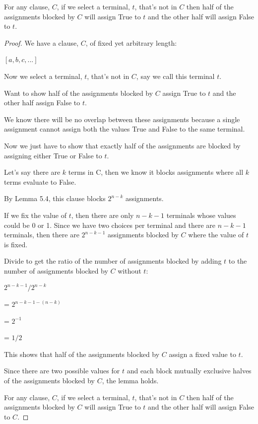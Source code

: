 \documentclass[manuscript]{acmart}
\begin{document}
    \begin{lemma}
        For any clause, $C$, if we select a terminal, $t$, that's not in $C$ 
        then half of the assignments
        blocked by $C$ will assign True to $t$ and the other half will assign 
        False to $t$.
    \end{lemma}
    \begin{proof}
        We have a clause, $C$, of fixed yet arbitrary length:

        $[a, b, c, ...]$

        Now we select a terminal, $t$, that's not in $C$, say we call this
        terminal $t$.

        Want to show half of the assignments blocked by $C$ assign True to 
        $t$ and the other half assign False to $t$.

        We know there will be no overlap between these assignments because a single assignment
        cannot assign both the values True and False to the same terminal.

        Now we just have to show that exactly half of the assignments are blocked 
        by assigning either True or False to $t$.

        Let's say there are $k$ terms in C, then we know it blocks assignments 
        where all $k$ terms evaluate to False.

        By Lemma 5.4, this clause blocks $2^{n-k}$ assignments. 

        If we fix the value of $t$, then there are only $n-k-1$ terminals
        whose values could be 0 or 1. Since we have two choices per terminal
        and there are $n-k-1$ terminals, then there are $2^{n-k-1}$ assignments
        blocked by $C$ where the value of $t$ is fixed.

        Divide to get the ratio of the number of assignments blocked by adding 
        $t$ to the number of assignments blocked by $C$ without $t$:
        
        $2^{n-k-1}/2^{n-k}$

        = $2^{n - k - 1 - (n - k)}$

        = $2^{-1}$

        = $1/2$

        This shows that half of the assignments blocked by $C$ assign a fixed
        value to $t$.

        Since there are two possible values for $t$ and each block mutually
        exclusive halves of the assignments blocked by $C$, the lemma holds.

        For any clause, $C$, if we select a terminal, $t$, that's not
        in $C$ then half of the assignments blocked by $C$ will assign True
        to $t$ and the other half will assign False to $C$.
    \end{proof}
\end{document}

